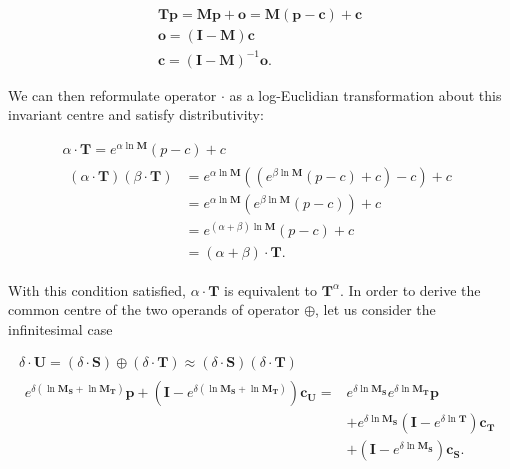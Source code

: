         \begin{gather}
          \mathbf{Tp} = \mathbf{Mp} + \mathbf{o} = \mathbf{M}(\mathbf{p}-\mathbf{c}) + \mathbf{c} \\
          \mathbf{o} = (\mathbf{I} - \mathbf{M})\mathbf{c} \\
          \mathbf{c} = (\mathbf{I} - \mathbf{M})^{-1}\mathbf{o}.
        \end{gather}
        
        We can then reformulate operator $\cdot$ as a log-Euclidian transformation about this invariant centre and satisfy distributivity:
        
        \begin{gather}
          \alpha \cdot \mathbf{T} = e^{\alpha\ln\mathbf{M}}(p - c) + c \label{eqn:affine_cdot} \\
          \begin{split}
            (\alpha \cdot \mathbf{T})(\beta \cdot \mathbf{T}) &= e^{\alpha\ln\mathbf{M}}((e^{\beta\ln\mathbf{M}}(p - c) + c) - c) + c \\
                                                              &= e^{\alpha\ln\mathbf{M}}(e^{\beta\ln\mathbf{M}}(p - c)) + c \\
                                                              &= e^{(\alpha + \beta)\ln\mathbf{M}}(p - c) + c \\
                                                              &= (\alpha + \beta) \cdot \mathbf{T}.
          \end{split}
        \end{gather}
        
        With this condition satisfied, $\alpha\cdot\mathbf{T}$ is equivalent to $\mathbf{T}^{\alpha}$. In order to derive the common centre of the two operands of operator $\oplus$, let us consider the infinitesimal case
        
        \begin{gather}
          \delta \cdot \mathbf{U} = (\delta \cdot \mathbf{S}) \oplus (\delta \cdot \mathbf{T}) \approx (\delta \cdot \mathbf{S}) (\delta \cdot \mathbf{T}) \\
          \begin{split}
            e^{\delta(\ln \mathbf{M_S} + \ln \mathbf{M_T})}\mathbf{p} + (\mathbf{I} - e^{\delta(\ln \mathbf{M_S} + \ln \mathbf{M_T})})\mathbf{c_U} =
              &e^{\delta \ln \mathbf{M_S}}e^{\delta \ln \mathbf{M_T}}\mathbf{p} \\
              &+ e^{\delta \ln \mathbf{M_S}}(\mathbf{I} - e^{\delta \ln \mathbf{T}})\mathbf{c_T} \\
              &+ (\mathbf{I} - e^{\delta \ln \mathbf{M_S}})\mathbf{c_S}. \label{eqn:infinitesimal_oplus}
          \end{split}
        \end{gather}
        
